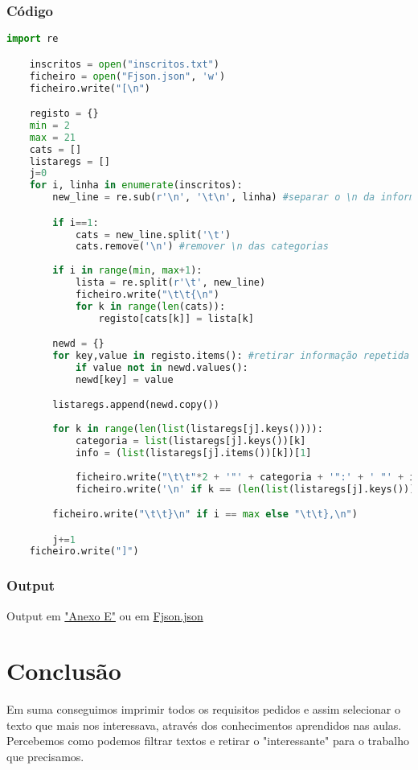 \documentclass[11pt,a4paper]{report}
\begin{document}
	\subsection{Código}
	\begin{lstlisting}[language=python]
    import re

    inscritos = open("inscritos.txt")
    ficheiro = open("Fjson.json", 'w')
    ficheiro.write("[\n")

    registo = {}
    min = 2
    max = 21
    cats = []   
    listaregs = []
    j=0
    for i, linha in enumerate(inscritos):
        new_line = re.sub(r'\n', '\t\n', linha) #separar o \n da informação final

        if i==1:
            cats = new_line.split('\t')
            cats.remove('\n') #remover \n das categorias
  
        if i in range(min, max+1):
            lista = re.split(r'\t', new_line)
            ficheiro.write("\t\t{\n")
            for k in range(len(cats)):
                registo[cats[k]] = lista[k]

        newd = {}
        for key,value in registo.items(): #retirar informação repetida
            if value not in newd.values():
            newd[key] = value

        listaregs.append(newd.copy())
    
        for k in range(len(list(listaregs[j].keys()))):
            categoria = list(listaregs[j].keys())[k]
            info = (list(listaregs[j].items())[k])[1]
     
            ficheiro.write("\t\t"*2 + '"' + categoria + '":' + ' "' + info + '"')
            ficheiro.write('\n' if k == (len(list(listaregs[j].keys()))-1) else ',\n')

        ficheiro.write("\t\t}\n" if i == max else "\t\t},\n")

        j+=1
    ficheiro.write("]")
    \end{lstlisting}
    
    \subsection{Output}
        Output em \hyperlink{Anexo E}{"Anexo E"} ou em \href{run:./Fjson.txt}{Fjson.json}
    

\pagebreak
    
    
    
	
	\chapter{Conclusão}
	Em suma conseguimos imprimir todos os requisitos pedidos e assim selecionar o texto que mais nos interessava, através dos conhecimentos aprendidos nas aulas. Percebemos como podemos filtrar textos e retirar o "interessante" para o trabalho que precisamos.
    
\end{document}
